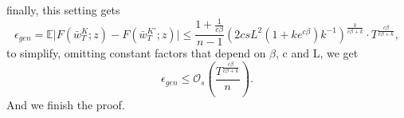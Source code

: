 finally, this setting gets
 \begin{equation}\label{with-con-result}
  \epsilon_{gen} = \mathbb{E}\vert F(\bar{w}_T^{K};z)-F(\bar{w}^{K\prime}_T;z)\vert \leq \frac{1+\frac{1}{c\beta}}{n-1}\left(2csL^2(1+ke^{c\beta})k^{-1}\right)^{\frac{k}{c\beta+k}}\cdot T^{\frac{c\beta}{c\beta+k}},
 \end{equation}
to simplify, omitting constant factors that depend on $\beta$, c
and L, we get 
   \begin{equation}
    \epsilon_{gen}  \leq \mathcal{O}_s\left(\frac{T^{\frac{c\beta}{c\beta+k}}}{n}\right).
   \end{equation}
And we finish the proof.
